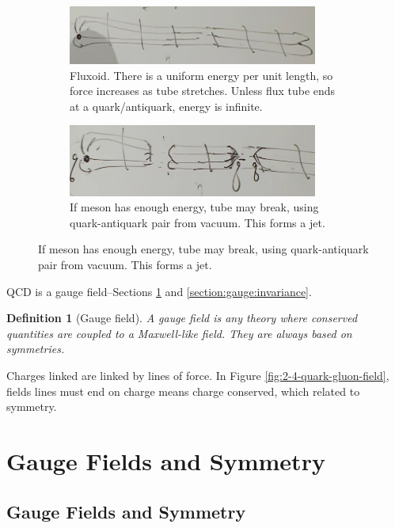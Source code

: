 \documentclass[]{article}
\newtheorem{defn}[thm]{Definition}
\begin{document}
\begin{figure}[H]
\begin{subfigure}[t]{0.45\textwidth}
	\end{subfigure}
	\begin{subfigure}[t]{0.45\textwidth}
		\caption{Fluxoid. There is a uniform energy per unit length, so force increases as tube stretches. Unless flux tube ends at a quark/antiquark, energy is infinite.}
		\includegraphics[width=0.9\textwidth]{2-4-quark-gluon-field-tube-uniform-energy}
	\end{subfigure}
	\begin{subfigure}[t]{0.45\textwidth}
		\caption{If meson has enough energy, tube may break, using quark-antiquark pair from vacuum. This forms a jet.}
		\includegraphics[width=0.9\textwidth]{2-4-split-meson}
	\end{subfigure}
\end{figure}

QCD is a gauge field--Sections \ref{section:gauge:symmetry} and \ref{section:gauge:invariance}.

\begin{defn}[Gauge field]\label{defn:gauge:field}
	A gauge field is any theory where conserved quantities are coupled to a Maxwell-like field. They are always based on symmetries.
\end{defn}

Charges linked are linked by lines of force. In Figure \ref{fig:2-4-quark-gluon-field}, fields lines must end on charge means charge conserved, which related to symmetry.

\section{Gauge Fields and Symmetry}\label{section:gauge:symmetry}

\subsection{Gauge Fields and Symmetry}
\end{document}
